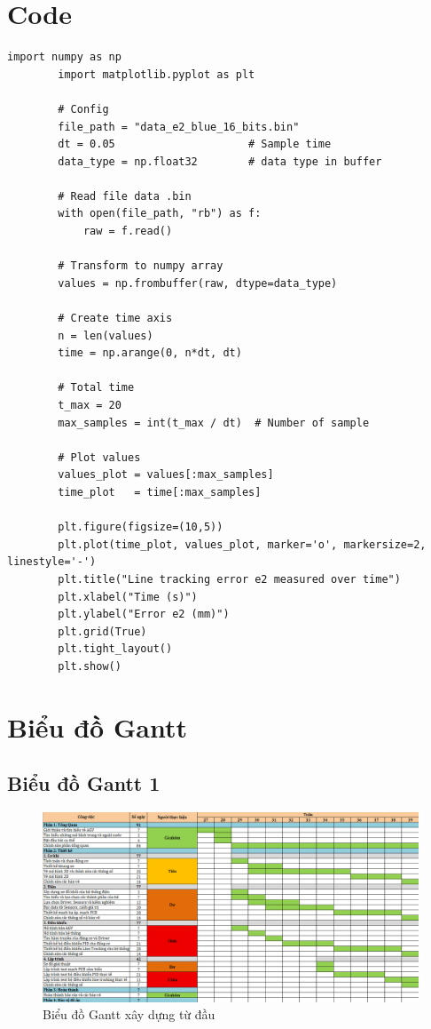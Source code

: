     \section{Code}
    \begin{lstlisting}[caption={Đọc file nhị phân và plot sai số e2}, label={lst:e2_plot}]
        import numpy as np
        import matplotlib.pyplot as plt

        # Config
        file_path = "data_e2_blue_16_bits.bin" 
        dt = 0.05                     # Sample time
        data_type = np.float32        # data type in buffer

        # Read file data .bin
        with open(file_path, "rb") as f:
            raw = f.read()

        # Transform to numpy array
        values = np.frombuffer(raw, dtype=data_type)

        # Create time axis
        n = len(values)
        time = np.arange(0, n*dt, dt)

        # Total time
        t_max = 20
        max_samples = int(t_max / dt)  # Number of sample

        # Plot values
        values_plot = values[:max_samples]
        time_plot   = time[:max_samples]

        plt.figure(figsize=(10,5))
        plt.plot(time_plot, values_plot, marker='o', markersize=2, linestyle='-')
        plt.title("Line tracking error e2 measured over time")
        plt.xlabel("Time (s)")
        plt.ylabel("Error e2 (mm)")
        plt.grid(True)
        plt.tight_layout()
        plt.show()
    \end{lstlisting}
    \section{Biểu đồ Gantt}
        \subsection{Biểu đồ Gantt 1}
            \begin{figure}[H]
                \centering
                \includegraphics[width=0.8\textheight,angle=-90]{pictures/appendix/gantt1.png}
                \caption{Biểu đồ Gantt xây dựng từ đầu}
                \label{gantt1}
            \end{figure}
